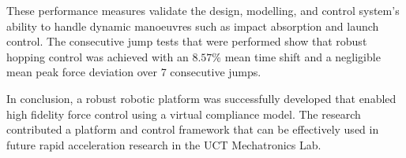 These performance measures validate the design, modelling, and control system's ability to handle dynamic manoeuvres such as impact absorption and launch control. The consecutive jump tests that were performed show that robust hopping control was achieved with an $8.57\%$ mean time shift and a negligible mean peak force deviation over 7 consecutive jumps.  

In conclusion, a robust robotic platform was successfully developed that enabled high fidelity force control using a virtual compliance model. The research contributed a platform and control framework that can be effectively used in future rapid acceleration research in the UCT Mechatronics Lab.